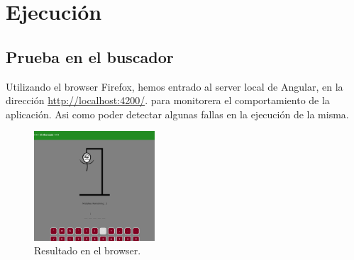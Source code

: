 \section{Ejecución}

\subsection{Prueba en el buscador}

Utilizando el browser Firefox, hemos entrado al server local de Angular, en la dirección \url{http://localhost:4200/}.
para monitorera el comportamiento de la aplicación. Asi como poder detectar algunas fallas en la ejecución de la misma.

\begin{figure}[h]
  \centering
  \includegraphics[width=0.4\textwidth]{img/resultado.png}  %
  \caption{Resultado en el browser.}
\end{figure}


